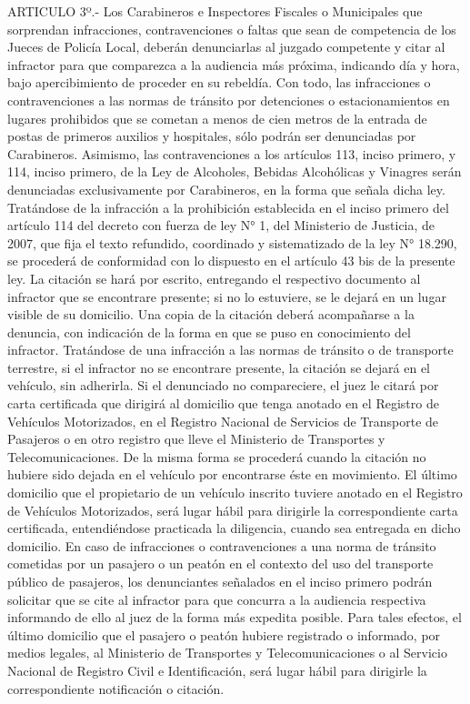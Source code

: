     ARTICULO 3º.- Los Carabineros e Inspectores Fiscales o Municipales que sorprendan infracciones, contravenciones o faltas que sean de competencia de los Jueces de Policía Local, deberán denunciarlas al juzgado competente y citar al infractor para que comparezca a la audiencia más próxima, indicando día y hora, bajo apercibimiento de proceder en su rebeldía. Con todo, las infracciones o contravenciones a las normas de tránsito por detenciones o estacionamientos en lugares prohibidos que se cometan a menos de cien metros de la entrada de postas de primeros auxilios y hospitales, sólo podrán ser denunciadas por Carabineros. Asimismo, las contravenciones a los artículos 113, inciso primero, y 114, inciso primero, de la Ley de Alcoholes, Bebidas Alcohólicas y Vinagres serán denunciadas exclusivamente por Carabineros, en la forma que señala dicha ley. Tratándose de la infracción a la prohibición establecida en el inciso primero del artículo 114 del decreto con fuerza de ley N° 1, del Ministerio de Justicia, de 2007, que fija el texto refundido, coordinado y sistematizado de la ley N° 18.290, se procederá de conformidad con lo dispuesto en el artículo 43 bis de la presente ley.
    La citación se hará por escrito, entregando el respectivo documento al infractor que se encontrare presente; si no lo estuviere, se le dejará en un lugar visible de su domicilio. Una copia de la citación deberá acompañarse a la denuncia, con indicación de la forma en que se puso en conocimiento del infractor.
    Tratándose de una infracción a las normas de tránsito o de transporte terrestre, si el infractor no se encontrare presente, la citación se dejará en el vehículo, sin adherirla. Si el denunciado no compareciere, el juez le citará por carta certificada que dirigirá al domicilio que tenga anotado en el Registro de Vehículos Motorizados, en el Registro Nacional de Servicios de Transporte de Pasajeros o en otro registro que lleve el Ministerio de Transportes y Telecomunicaciones. De la misma forma se procederá cuando la citación no hubiere sido dejada en el vehículo por encontrarse éste en movimiento. El último domicilio que el propietario de un vehículo inscrito tuviere anotado en el Registro de Vehículos Motorizados, será lugar hábil para dirigirle la correspondiente carta certificada, entendiéndose practicada la diligencia, cuando sea entregada en dicho domicilio.
    En caso de infracciones o contravenciones a una norma de tránsito cometidas por un pasajero o un peatón en el contexto del uso del transporte público de pasajeros, los denunciantes señalados en el inciso primero podrán solicitar que se cite al infractor para que concurra a la audiencia respectiva informando de ello al juez de la forma más expedita posible. Para tales efectos, el último domicilio que el pasajero o peatón hubiere registrado o informado, por medios legales, al Ministerio de Transportes y Telecomunicaciones o al Servicio Nacional de Registro Civil e Identificación, será lugar hábil para dirigirle la correspondiente notificación o citación.
